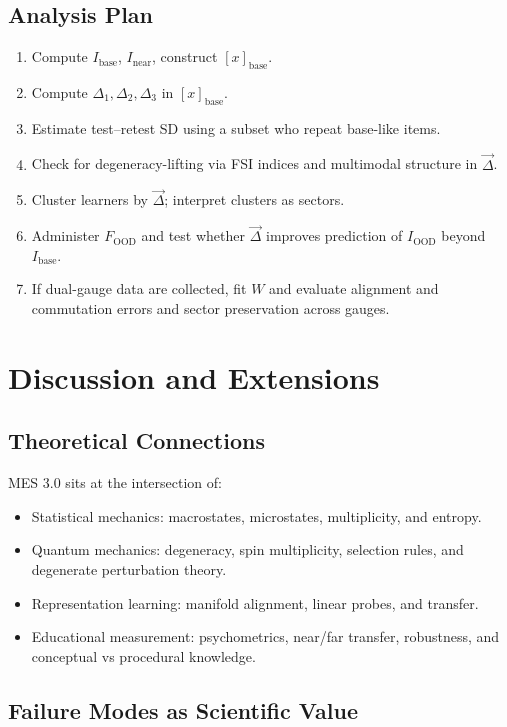 \documentclass[11pt]{article}
\begin{document}
\subsection{Analysis Plan}

\begin{enumerate}[itemsep=3pt]
  \item Compute $I_{\text{base}}$, $I_{\text{near}}$, construct $[x]_{\text{base}}$.
  \item Compute $\Delta_1, \Delta_2, \Delta_3$ in $[x]_{\text{base}}$.
  \item Estimate test–retest SD using a subset who repeat base-like items.
  \item Check for degeneracy-lifting via FSI indices and multimodal structure in $\vec{\Delta}$.
  \item Cluster learners by $\vec{\Delta}$; interpret clusters as sectors.
  \item Administer $F_{\text{OOD}}$ and test whether $\vec{\Delta}$ improves prediction of $I_{\text{OOD}}$ beyond $I_{\text{base}}$.
  \item If dual-gauge data are collected, fit $W$ and evaluate alignment and commutation errors and sector preservation across gauges.
\end{enumerate}

\section{Discussion and Extensions}

\subsection{Theoretical Connections}

MES 3.0 sits at the intersection of:
\begin{itemize}[itemsep=3pt]
  \item Statistical mechanics: macrostates, microstates, multiplicity, and entropy.
  \item Quantum mechanics: degeneracy, spin multiplicity, selection rules, and degenerate perturbation theory.
  \item Representation learning: manifold alignment, linear probes, and transfer.
  \item Educational measurement: psychometrics, near/far transfer, robustness, and conceptual vs procedural knowledge.
\end{itemize}

\subsection{Failure Modes as Scientific Value}
\end{document}
